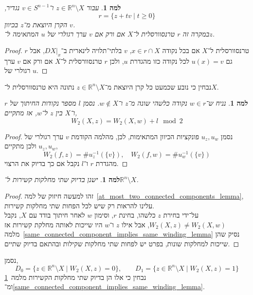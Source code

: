 \documentclass[aspectratio=169,notheorems,mathserif]{beamer}
\newcommand{\RR}[0]{\mathbb{R}}
\theoremstyle{c_plain}
\newtheorem{lemma}[theorem]{למה}
\theoremstyle{c_definition}
\theoremstyle{c_remark}
\begin{document}
\begin{frame}
	\begin{lemma}
		עבור $z \in \RR^n \setminus X$ ו־$v \in S^{n - 1}$ נגדיר,
		\[
			r = \{ z + t v \mid t \ge 0 \}
		\]
		הקרן היוצאת מ־$z$ בכיוון $v$. \\
		במקרה זה $r$ טרנסוורסלית ל־$X$ אם ורק אם $v$ ערך רגולרי של $u$ המתאימה ל־$z$.
	\end{lemma}
	\begin{proof}
		$r$ טרנסוורסלית ל־$X$ אם בכל נקודה $x \in r \cap X$, $v$ בלתי־תלויה לינארית ב־$D X |_x$, אבל גם $u(x) = v$ לכל נקודה כזו מהגדרת $u$, ולכן $r$ טרנסוורסלית ל־$X$ אם ורק אם $v$ ערך רגולרי של $u$.
	\end{proof}
	נבחין כי נובע שכמעט כל קרן היוצאת מ־$z \in \RR^n \setminus X$ נתונה היא טרנסוורסלית ל־$X$.
\end{frame}
\begin{frame}
	\begin{lemma}
		נניח ש־$w \in r$ נקודה כלשהי שונה מ־$z$ ו־$w \notin X$.
		נסמן $l$ מספר נקודות החיתוך של $r$ ו־$X$ בין $z$ ל־$w$,
		אז מתקיים,
		\[
			W_2(X, z)
			= W_2(X, w) + l \mod 2
		\]
	\end{lemma}
	\begin{proof}
		נסמן $u_z, u_w$ פונקציות הכיוון המתאימות, לכן,
		מהלמה הקודמת $v$ ערך רגולרי של $u_z, u_w$ ולכן מתקיים,
		\[
			W_2(f, z) = \# u_z^{-1}(\{ v \}),
			\quad
			W_2(f, w) = \# u_w^{-1}(\{ v \})
		\]
		מהגדרת $r$ ו־$l$ נקבל אם כך בדיוק את הרצוי.
	\end{proof}
\end{frame}
\begin{frame}
	\begin{lemma}\label{exactly_two_connected_components_lemma}
		ישנן בדיוק שתי מחלקות קשירות ל־$\RR^n \setminus X$.
	\end{lemma}
	\begin{proof}
		זהו למעשה חיזוק של למה\ \ref{at_most_two_connected_components_lemma}, עלינו להראות רק שיש לכל הפחות שתי מחלקות קשירות. \\
		על־ידי בחירת $z$ כלשהו, בחינת $r$, וסימון $w$ לאחר חיתוך בודד עם $X$, נקבל $W_2(X, z) \ne W_2(X, w)$,
		אבל אילו $z$ ו־$w$ היו שייכות לאותה מחלקת קשירות אז מלמה\ \ref{same_connected_component_implies_same_winding_lemma} נסיק שהן שייכות למחלקות שונות, בפרט יש לפחות שתי מחלקות שקילות ובהתאם בדיוק שתיים.
	\end{proof}
	נסמן,
	\[
		D_0 = \{ z \in \RR^n \setminus X \mid W_2(X, z) = 0 \},
		\qquad
		D_1 = \{ z \in \RR^n \setminus X \mid W_2(X, z) = 1 \}
	\]
	נבחין כי אלו הן בדיוק שתי מחלקות הקשירות מלמה\ \ref{exactly_two_connected_components_lemma} ומ־\ref{same_connected_component_implies_same_winding_lemma}.
\end{frame}
\end{document}
